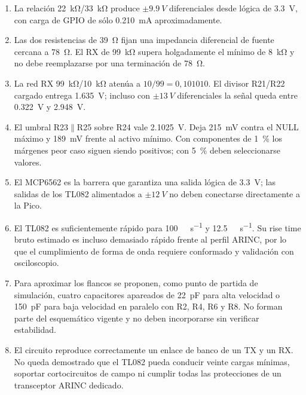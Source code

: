 \documentclass[11pt,a4paper]{article}
\begin{document}
\begin{enumerate}
  \item La relación \SI{22}{\kilo\ohm}/\SI{33}{\kilo\ohm} produce
  $\pm\SI{9.9}{V}$ diferenciales desde lógica de \SI{3.3}{V}, con carga de
  GPIO de sólo \SI{0.210}{\milli\ampere} aproximadamente.

  \item Las dos resistencias de \SI{39}{\ohm} fijan una impedancia diferencial
  de fuente cercana a \SI{78}{\ohm}. El RX de \SI{99}{\kilo\ohm} supera
  holgadamente el mínimo de \SI{8}{\kilo\ohm} y no debe reemplazarse por una
  terminación de \SI{78}{\ohm}.

  \item La red RX \SI{99}{\kilo\ohm}/\SI{10}{\kilo\ohm} atenúa a
  $10/99=0{,}101010$. El divisor R21/R22 cargado entrega \SI{1.635}{V}; incluso
  con $\pm\SI{13}{V}$ diferenciales la señal queda entre \SI{0.322}{V} y
  \SI{2.948}{V}.

  \item El umbral R23$\parallel$R25 sobre R24 vale \SI{2.1025}{V}. Deja
  \SI{215}{\milli\volt} contra el NULL máximo y \SI{189}{\milli\volt} frente
  al activo mínimo. Con componentes de \SI{1}{\percent} los márgenes peor caso
  siguen siendo positivos; con \SI{5}{\percent} deben seleccionarse valores.

  \item El MCP6562 es la barrera que garantiza una salida lógica de
  \SI{3.3}{V}; las salidas de los TL082 alimentados a $\pm\SI{12}{V}$ no deben
  conectarse directamente a la Pico.

  \item El TL082 es suficientemente rápido para \SI{100}{\kilo\bit\per\second}
  y \SI{12.5}{\kilo\bit\per\second}. Su rise time bruto estimado es incluso
  demasiado rápido frente al perfil ARINC, por lo que el cumplimiento de forma
  de onda requiere conformado y validación con osciloscopio.

  \item Para aproximar los flancos se proponen, como punto de partida de
  simulación, cuatro capacitores apareados de \SI{22}{pF} para alta velocidad o
  \SI{150}{pF} para baja velocidad en paralelo con R2, R4, R6 y R8. No forman
  parte del esquemático vigente y no deben incorporarse sin verificar estabilidad.

  \item El circuito reproduce correctamente un enlace de banco de un TX y un RX.
  No queda demostrado que el TL082 pueda conducir veinte cargas mínimas, soportar
  cortocircuitos de campo ni cumplir todas las protecciones de un transceptor
  ARINC dedicado.
\end{enumerate}
\end{document}
